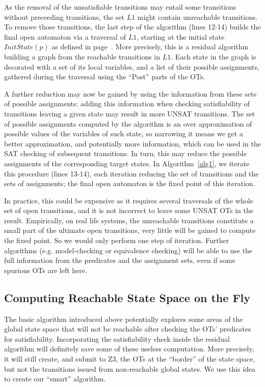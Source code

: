 \documentclass[smallcondensed]{svjour3}
\newcommand{\QIN}[1]{\textcolor{airforceblue}{#1}}
\newcommand{\YX}[1]{{\color{red}#1}}
\begin{document}
\QIN{As the removal of the unsatisfiable transitions \YX{may entail some transitions without preceeding} transitions, }
the set $L1$ might contain unreachable transitions. To remove those transitions, the last step of the  
algorithm (lines 12-14) builds the final open automaton via a traversal of $L1$,
starting at the initial state $InitState(p)$ as defined in
page~\pageref{def-states}. More precisely, this is a residual
algorithm building a graph from the reachable transitions in $L1$. 
Each state in the graph is decorated with a set of its local
variables, and a list of their possible assignments,
gathered during the traversal using the ``Post'' parts of the
OTs.

A further reduction may now be gained by using the information from
these sets of possible assignments: adding this information when
checking satisfiability of transitions leaving a given state may
result in more UNSAT transitions. The set of possible
assignments computed by the algorithm is an over approximation of
possible values of the 
variables of such state, so narrowing it means we get a better
approximation, and potentially more information, which can be used in
the SAT checking of subsequent transitions. In turn, this may reduce the possible
assignments of the corresponding target states. In
Algorithm~\ref{alg1}, we iterate this procedure (lines 13-14), each iteration
reducing the set of 
transitions and the sets of assignments; the final open automaton
is the fixed point of this iteration.

In practice, this could be
expensive \QIN{as it requires several traversals of the whole set of open transitions}, and it is not incorrect to leave some UNSAT OTs in the
result. \QIN{\YX{Empirically, on real life systems, the unreachable transitions constitute  a small part of the ultimate} open transitions, very little will be gained to compute the fixed point. So we would only perform one step of iteration.} Further algorithms 
(e.g. model-checking or equivalence checking) will be able to use the
full information from the predicates and the assignment sets, even if
some spurious OTs are left here.

\subsection{Computing Reachable State Space on the Fly}

The basic algorithm introduced above potentially explores some
areas of the global state space that will not be reachable after
checking the OTs' predicates for satisfiability. Incorporating the
satisfiability check inside the residual algorithm will definitely
save some of these useless computation. More precisely, it will still
create, and submit to Z3, the OTs at the ``border'' of the state space, but
not the transitions issued from non-reachable global states. We use
this idea to create our ``smart'' algorithm.
\end{document}
